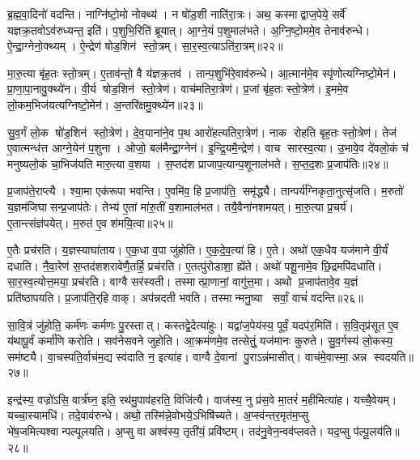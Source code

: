 ब्र॒ह्म॒वा॒दिनो॑ वदन्ति।
नाग्नि॑ष्टो॒मो नोक्थ्य॑।
न षो॑ड॒शी नाति॑रा॒त्रः।
अथ॒ कस्माद्वाज॒पेये॒ सर्वे॑ यज्ञक्र॒तवोऽव॑रुध्यन्त॒ इति॑।
प॒शुभि॒रिति॑ ब्रूयात्।
आ॒ग्ने॒यं प॒शुमाल॑भते।
अ॒ग्नि॒ष्टो॒ममे॒व तेनाव॑रुन्धे।
ऐ॒न्द्रा॒ग्नेनो॒क्थ्यम्।
ऐ॒न्द्रेण॑ षोड॒शिन॑ स्तो॒त्रम्।
सा॒र॒स्व॒त्याऽति॑रा॒त्रम्॥२२॥

मा॒रु॒त्या बृ॑ह॒तः स्तो॒त्रम्।
ए॒ताव॑न्तो॒ वै य॑ज्ञक्र॒तव॑।
तान्प॒शुभि॑रे॒वाव॑रुन्धे।
आ॒त्मान॑मे॒व स्पृ॑णोत्यग्निष्टो॒मेन॑।
प्रा॒णा॒पा॒नावु॒क्थ्ये॑न।
वी॒र्य षोड॒शिन॑ स्तो॒त्रेण॑।
वाच॑मतिरा॒त्रेण॑।
प्र॒जां बृ॑ह॒तः स्तो॒त्रेण॑।
इ॒ममे॒व लो॒कम॒भिज॑यत्यग्निष्टो॒मेन॑।
अ॒न्तरि॑क्षमु॒क्थ्ये॑न॥२३॥

सु॒व॒र्गं लो॒क षो॑ड॒शिन॑ स्तो॒त्रेण॑।
दे॒व॒याना॑ने॒व प॒थ आरो॑हत्यतिरा॒त्रेण॑।
नाक रोहति बृह॒तः स्तो॒त्रेण॑।
तेज॑ ए॒वात्मन्ध॑त्त आग्ने॒येन॑ प॒शुना।
ओजो॒ बल॑मैन्द्रा॒ग्नेन॑।
इ॒न्द्रि॒यमै॒न्द्रेण॑।
वाच सारस्व॒त्या।
उ॒भावे॒व दे॑वलो॒कं च॑ मनुष्यलो॒कं चा॒भिज॑यति मारु॒त्या व॒शया।
स॒प्तद॑श प्राजाप॒त्यान्प॒शूनाल॑भते।
स॒प्त॒द॒शः प्र॒जाप॑तिः॥२४॥

प्र॒जाप॑ते॒राप्त्यै।
श्या॒मा एक॑रूपा भवन्ति।
ए॒वमि॑व॒ हि प्र॒जाप॑ति॒ समृ॑द्ध्यै।
तान्पर्य॑ग्निकृता॒नुत्सृ॑जति।
म॒रुतो॑ य॒ज्ञम॑जिघासन्प्र॒जाप॑तेः।
तेभ्य॑ ए॒तां मा॑रु॒तीं व॒शामाल॑भत।
तयै॒वैना॑नशमयत्।
मा॒रु॒त्या प्र॒चर्य॑।
ए॒तान्त्संज्ञ॑पयेत्।
म॒रुत॑ ए॒व श॑मयि॒त्वा॥२५॥

ए॒तैः प्रच॑रति।
य॒ज्ञस्याघा॑ताय।
ए॒क॒धा व॒पा जु॑होति।
ए॒क॒दे॒व॒त्या॑ हि।
ए॒ते।
अथो॑ एक॒धैव यज॑माने वी॒र्यं॑ दधाति।
नै॒वा॒रेण॑ स॒प्तद॑शशरावेणै॒तर्\mbox{}हि॒ प्रच॑रति।
ए॒तत्पु॑रोडाशा॒ ह्ये॑ते।
अथो॑ पशू॒नामे॒व छि॒द्रमपि॑दधाति।
सा॒र॒स्व॒त्योत्त॒मया॒ प्रच॑रति।
वाग्वै सर॑स्वती।
तस्मात्प्रा॒णानां॒ वागु॑त्त॒मा।
अथो प्र॒जाप॑तावे॒व य॒ज्ञं प्रति॑ष्ठापयति।
प्र॒जाप॑ति॒र्‌हि वाक्।
अप॑न्नदती भवति।
तस्मान्मनु॒ष्या सर्वां॒ वाचं॑ वदन्ति॥२६॥\anuvakamend[अ॒ति॒रा॒त्रम॒न्तरि॑क्षमु॒क्थ्ये॑न प्र॒जाप॑तिः शमयि॒त्वोत्त॒मया॒ प्रच॑रति॒ षट् च॑]

सा॒वि॒त्रं जु॑होति॒ कर्म॑णः कर्मणः पु॒रस्तात्।
कस्तद्वे॒देत्या॑हुः।
यद्वा॑ज॒पेय॑स्य॒ पूर्वं॒ यदप॑र॒मिति॑।
स॒वि॒तृप्र॑सूत ए॒व य॑थापू॒र्वं कर्मा॑णि करोति।
सव॑नेसवने जुहोति।
आ॒क्रम॑णमे॒व तत्सेतुं॒ यज॑मानः कुरुते।
सु॒व॒र्गस्य॑ लो॒कस्य॒ सम॑ष्ट्यै।
वा॒चस्पति॒र्वाच॑म॒द्य स्व॑दाति न॒ इत्या॑ह।
वाग्वै दे॒वानां पु॒राऽन्न॑मासीत्।
वाच॑मे॒वास्मा॒ अन्न स्वदयति॥२७॥

इन्द्र॑स्य॒ वज्रो॑ऽसि॒ वार्त्र॑घ्न॒ इति॒ रथ॑मु॒पाव॑हरति॒ विजि॑त्यै।
वाज॑स्य॒ नु प्र॑स॒वे मा॒तरं॑ म॒हीमित्या॑ह।
यच्चै॒वेयम्।
यच्चा॒स्यामधि॑।
तदे॒वाव॑रुन्धे।
अथो॒ तस्मि॑न्ने॒वोभये॒ऽभिषि॑च्यते।
अ॒प्स्व॑न्तर॒मृत॑म॒प्सु भे॑ष॒जमित्यश्वान्पल्पूलयति।
अ॒प्सु वा अश्व॑स्य॒ तृती॑यं॒ प्रवि॑ष्टम्।
तद॑नु॒वेन॒न्वव॑प्लवते।
यद॒प्सु प॑ल्पू॒लय॑ति॥२८॥

